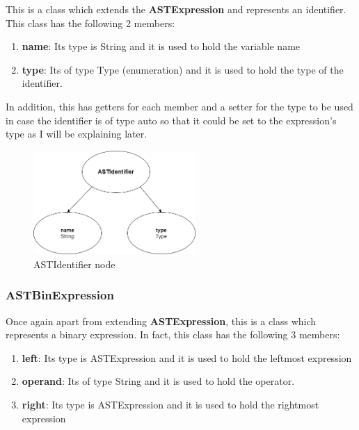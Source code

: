 \documentclass{article}
\begin{document}
					This is a class which extends the \textbf{ASTExpression} and represents an identifier. This class has the following 2 members: 
					\begin{enumerate}
					\item \textbf{name}: Its type is String and it is used to hold the variable name
					\item \textbf{type}: Its of type Type (enumeration) and it is used to hold the type of the identifier.
				
					\end{enumerate}
			In addition, this has getters for each member and a setter for the type to be used in case the identifier is of type auto so that it could be set to the expression's type as I will be explaining later.
					
					\begin{figure}[H]
					\centering
			 			\includegraphics[width=0.55\textwidth]{astidentifier.png}
			  			\caption{ASTIdentifier node}
			  			\label{fig:astidentifier}
					\end{figure}
					
					\subsubsection{ASTBinExpression}
					Once again apart from extending \textbf{ASTExpression}, this is a class which represents a binary expression. In fact, this class has the following 3 members:
					
					\begin{enumerate}
					\item \textbf{left}: Its type is ASTExpression and it is used to hold the leftmost expression
					\item \textbf{operand}: Its of type String and it is used to hold the operator.
					\item \textbf{right}: Its type is ASTExpression and it is used to hold the rightmost expression
					\end{enumerate}
				
\end{document}
